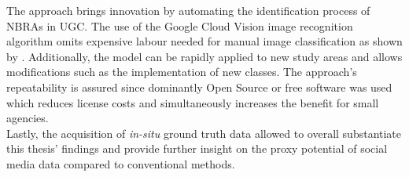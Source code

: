The approach brings innovation by automating the identification process of NBRAs in UGC. The use of the Google Cloud Vision image recognition algorithm omits expensive labour needed for manual image classification as shown by \textcite{Richards2018}. Additionally, the model can be rapidly applied to new study areas and allows modifications such as the implementation of new classes. The approach's repeatability is assured since dominantly Open Source or free software was used which reduces license costs and simultaneously increases the benefit for small agencies. \\
Lastly, the acquisition of \textit{in-situ} ground truth data allowed to overall substantiate this thesis' findings and provide further insight on the proxy potential of social media data compared to conventional methods. 

 